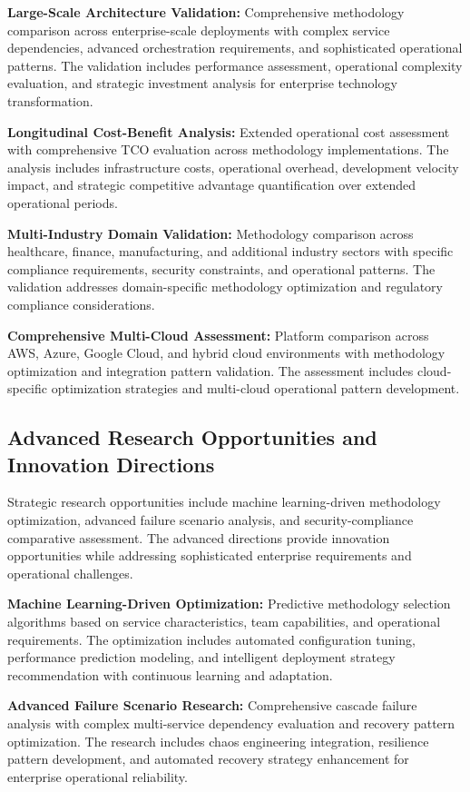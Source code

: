 \textbf{Large-Scale Architecture Validation:}
Comprehensive methodology comparison across enterprise-scale deployments with complex service dependencies, advanced orchestration requirements, and sophisticated operational patterns. The validation includes performance assessment, operational complexity evaluation, and strategic investment analysis for enterprise technology transformation.

\textbf{Longitudinal Cost-Benefit Analysis:}
Extended operational cost assessment with comprehensive TCO evaluation across methodology implementations. The analysis includes infrastructure costs, operational overhead, development velocity impact, and strategic competitive advantage quantification over extended operational periods.

\textbf{Multi-Industry Domain Validation:}
Methodology comparison across healthcare, finance, manufacturing, and additional industry sectors with specific compliance requirements, security constraints, and operational patterns. The validation addresses domain-specific methodology optimization and regulatory compliance considerations.

\textbf{Comprehensive Multi-Cloud Assessment:}
Platform comparison across AWS, Azure, Google Cloud, and hybrid cloud environments with methodology optimization and integration pattern validation. The assessment includes cloud-specific optimization strategies and multi-cloud operational pattern development.

\subsection{Advanced Research Opportunities and Innovation Directions}
\label{subsec:advanced_research}

Strategic research opportunities include machine learning-driven methodology optimization, advanced failure scenario analysis, and security-compliance comparative assessment. The advanced directions provide innovation opportunities while addressing sophisticated enterprise requirements and operational challenges.

\textbf{Machine Learning-Driven Optimization:}
Predictive methodology selection algorithms based on service characteristics, team capabilities, and operational requirements. The optimization includes automated configuration tuning, performance prediction modeling, and intelligent deployment strategy recommendation with continuous learning and adaptation.

\textbf{Advanced Failure Scenario Research:}
Comprehensive cascade failure analysis with complex multi-service dependency evaluation and recovery pattern optimization. The research includes chaos engineering integration, resilience pattern development, and automated recovery strategy enhancement for enterprise operational reliability.


